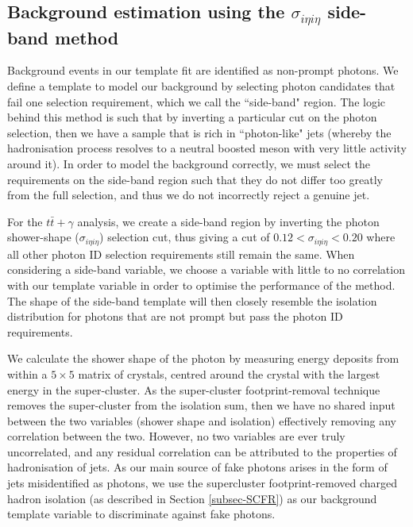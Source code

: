 \subsection{Background estimation using the $\sigma_{i \eta i \eta}$ side-band method} \label{subsec-BackgroundEstimation}

Background events in our template fit are identified as non-prompt photons. We define a template to model our background by selecting photon candidates that fail one selection requirement, which we call the ``side-band" region. The logic behind this method is such that by inverting a particular cut on the photon selection, then we have a sample that is rich in ``photon-like" jets (whereby the hadronisation process resolves to a neutral boosted meson with very little activity around it). In order to model the background correctly, we must select the requirements on the side-band region such that they do not differ too greatly from the full selection, and thus we do not incorrectly reject a genuine jet. 

For the $t\bar{t}+\gamma$ analysis, we create a side-band region by inverting the photon shower-shape ($\sigma_{i\eta i\eta}$) selection cut, thus giving a cut of $0.12 < \sigma_{i \eta i \eta} < 0.20$ where all other photon ID selection requirements still remain the same. When considering a side-band variable, we choose a variable with little to no correlation with our template variable in order to optimise the performance of the method. The shape of the side-band template will then closely resemble the isolation distribution for photons that are not prompt but pass the photon ID requirements. 

We calculate the shower shape of the photon by measuring energy deposits from within a $5 \times 5$ matrix of crystals, centred around the crystal with the largest energy in the super-cluster. As the super-cluster footprint-removal technique removes the super-cluster from the isolation sum, then we have no shared input between the two variables (shower shape and isolation) effectively removing any correlation between the two. However, no two variables are ever truly uncorrelated, and any residual correlation can be attributed to the properties of hadronisation of jets. As our main source of fake photons arises in the form of jets misidentified as photons, we use the supercluster footprint-removed charged hadron isolation (as described in Section \ref{subsec-SCFR}) as our background template variable to discriminate against fake photons.

